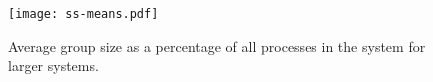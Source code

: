\begin{figure}
    \centering
    \texttt{[image: ss-means.pdf]}
    \caption{Average group size as a percentage of all processes in the system for larger systems.}
    \label{fig:ss-means}
\end{figure}







